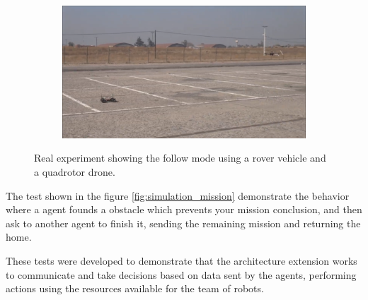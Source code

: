\begin{figure}[ht!]
\begin{subfigure}[b]{0.8\columnwidth}
  \end{subfigure}
  \begin{subfigure}[b]{0.8\columnwidth}
    \includegraphics[width=\textwidth]{img/follow_real4.png}
  \end{subfigure}

  \caption{Real experiment showing the follow mode using a rover vehicle and a quadrotor drone.}
  \label{fig:real}
\end{figure}

The test shown in the figure \ref{fig:simulation_mission} demonstrate the behavior where a agent founds a obstacle which prevents your mission conclusion, and then ask to another agent to finish it, sending the remaining mission and returning the home.

These tests were developed to demonstrate that the architecture extension works to communicate and take decisions based on data sent by the agents, performing actions using the resources available for the team of robots.


